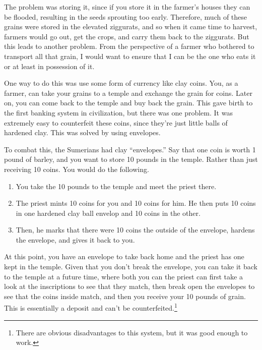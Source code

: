 \documentclass{article}
\begin{document}
    The problem was storing it, since if you store it in the farmer's houses they can be flooded, resulting in the seeds sprouting too early. Therefore, much of these grains were stored in the elevated ziggurats, and so when it came time to harvest, farmers would go out, get the crops, and carry them back to the ziggurats. But this leads to another problem. From the perspective of a farmer who bothered to transport all that grain, I would want to ensure that I can be the one who eats it or at least in possession of it. 

    One way to do this was use some form of currency like clay coins. You, as a farmer, can take your grains to a temple and exchange the grain for coins. Later on, you can come back to the temple and buy back the grain. This gave birth to the first banking system in civilization, but there was one problem. It was extremely easy to counterfeit these coins, since they're just little balls of hardened clay. This was solved by using envelopes. 

    \begin{finance}
      To combat this, the Sumerians had clay ``envelopes.'' Say that one coin is worth 1 pound of barley, and you want to store 10 pounds in the temple. Rather than just receiving 10 coins. You would do the following. 
      \begin{enumerate}
        \item You take the 10 pounds to the temple and meet the priest there. 
        \item The priest mints 10 coins for you and 10 coins for him. He then puts 10 coins in one hardened clay ball envelop and 10 coins in the other.  
        \item Then, he marks that there were 10 coins the outside of the envelope, hardens the envelope, and gives it back to you. 
      \end{enumerate}
      At this point, you have an envelope to take back home and the priest has one kept in the temple. Given that you don't break the envelope, you can take it back to the temple at a future time, where both you can the priest can first take a look at the inscriptions to see that they match, then break open the envelopes to see that the coins inside match, and then you receive your 10 pounds of grain. This is essentially a deposit and can't be counterfeited.\footnote{There are obvious disadvantages to this system, but it was good enough to work. } 
    \end{finance} 
\end{document}
